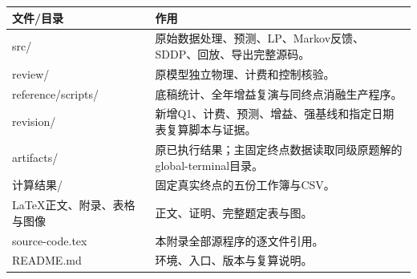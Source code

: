 \begin{longtable}{p{4.2cm}p{10cm}}\toprule 文件/目录&作用\\\midrule
src/&原始数据处理、预测、LP、Markov反馈、SDDP、回放、导出完整源码。\\
review/&原模型独立物理、计费和控制核验。\\
reference/scripts/&底稿统计、全年增益复演与同终点消融生产程序。\\
revision/&新增Q1、计费、预测、增益、强基线和指定日期表复算脚本与证据。\\
artifacts/&原已执行结果；主固定终点数据读取同级原题解的global-terminal目录。\\
计算结果/&固定真实终点的五份工作簿与CSV。\\
LaTeX正文、附录、表格与图像&正文、证明、完整题定表与图。\\
source-code.tex&本附录全部源程序的逐文件引用。\\
README.md&环境、入口、版本与复算说明。\\\bottomrule\end{longtable}
